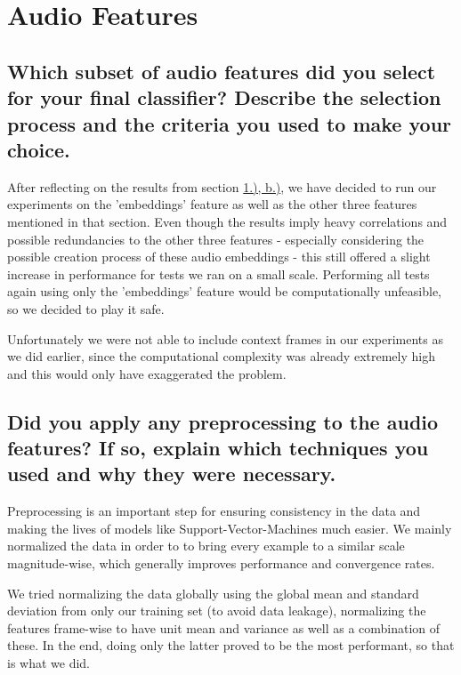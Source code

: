 
\section{Audio Features}
\label{sec:Audio Features}



\subsection{Which subset of audio features did you select for your final classifier? Describe the selection process and the criteria you used to make your choice.}
\label{sec:Audio Features:a}

After reflecting on the results from section \hyperref[sec:Labeling Function:b]{1.), b.)}, we have decided to run our experiments on the 'embeddings' feature as well as the other three features mentioned in that section. Even though the results imply heavy correlations and possible redundancies to the other three features - especially considering the possible creation process of these audio embeddings -  this still offered a slight increase in performance for tests we ran on a small scale. Performing all tests again using only the 'embeddings' feature would be computationally unfeasible, so we decided to play it safe.

Unfortunately we were not able to include context frames in our experiments as we did earlier, since the computational complexity was already extremely high and this would only have exaggerated the problem.


\subsection{Did you apply any preprocessing to the audio features? If so, explain which techniques you used and why they were necessary.}
\label{sec:Audio Features:b}

Preprocessing is an important step for ensuring consistency in the data and making the lives of models like Support-Vector-Machines much easier. We mainly normalized the data in order to to bring every example to a similar scale magnitude-wise, which generally improves performance and convergence rates.

We tried normalizing the data globally using the global mean and standard deviation from only our training set (to avoid data leakage), normalizing the features frame-wise to have unit mean and variance as well as a combination of these. In the end, doing only the latter proved to be the most performant, so that is what we did.




